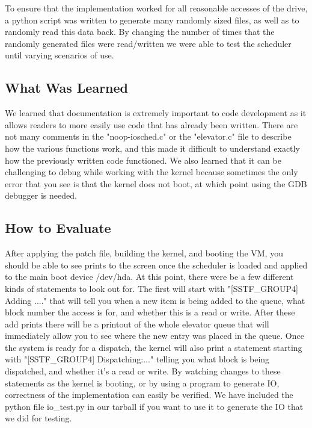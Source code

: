 To ensure that the implementation worked for all reasonable accesses of the drive, a python script was written to generate many randomly sized files, as well as to randomly read this data back. By changing the number of times that the randomly generated files were read/written we were able to test the scheduler until varying scenarios of use. 

\subsection{What Was Learned}
We learned that documentation is extremely important to code development as it allows readers to more easily use code that has already been written. There are not many comments in the "noop-iosched.c" or the "elevator.c" file to describe how the various functions work, and this made it difficult to understand exactly how the previously written code functioned. We also learned that it can be challenging to debug while working with the kernel because sometimes the only error that you see is that the kernel does not boot, at which point using the GDB debugger is needed.

\subsection{How to Evaluate}
After applying the patch file, building the kernel, and booting the VM, you should be able to see prints to the screen once the scheduler is loaded and applied to the main boot device /dev/hda. At this point, there were be a few different kinds of statements to look out for. The first will start with "[SSTF\_GROUP4] Adding ...." that will tell you when a new item is being added to the queue, what block number the access is for, and whether this is a read or write. After these add prints there will be a printout of the whole elevator queue that will immediately allow you to see where the new entry was placed in the queue. Once the system is ready for a dispatch, the kernel will also print a statement starting with "[SSTF\_GROUP4] Dispatching:..." telling you what block is being dispatched, and whether it's a read or write. By watching changes to these statements as the kernel is booting, or by using a program to generate IO, correctness of the implementation can easily be verified. We have included the python file io\_test.py in our tarball if you want to use it to generate the IO that we did for testing.
